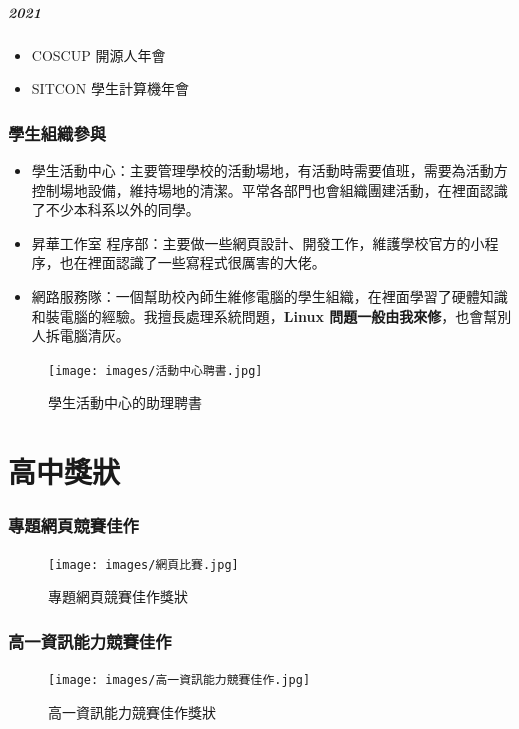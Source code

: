 \documentclass[classical]{einfart}
\providecommand{\tightlist}{%
  \setlength{\itemsep}{0pt}\setlength{\parskip}{0pt}}
\begin{document}
\subsubsection*{2021}

\begin{itemize}
\tightlist
\item
  COSCUP 開源人年會
\item
  SITCON 學生計算機年會
\end{itemize}
\newpage
\section{學生組織參與}

\begin{itemize}
\tightlist
\item
  學生活動中心：主要管理學校的活動場地，有活動時需要值班，需要為活動方控制場地設備，維持場地的清潔。平常各部門也會組織團建活動，在裡面認識了不少本科系以外的同學。
\item
  昇華工作室
  程序部：主要做一些網頁設計、開發工作，維護學校官方的小程序，也在裡面認識了一些寫程式很厲害的大佬。
\item
  網路服務隊：一個幫助校內師生維修電腦的學生組織，在裡面學習了硬體知識和裝電腦的經驗。我擅長處理系統問題，\textbf{Linux 問題一般由我來修}，也會幫別人拆電腦清灰。
\end{itemize}
\begin{figure}[H]
    \centering
    \texttt{[image: images/活動中心聘書.jpg]}
    \caption{學生活動中心的助理聘書}
\end{figure}

\part{高中獎狀}

\section{專題網頁競賽佳作}

\begin{figure}[H]
    \centering
    \texttt{[image: images/網頁比賽.jpg]}
    \caption{專題網頁競賽佳作獎狀}
\end{figure}

\section{高一資訊能力競賽佳作}

\begin{figure}[H]
    \centering
    \texttt{[image: images/高一資訊能力競賽佳作.jpg]}
    \caption{高一資訊能力競賽佳作獎狀}
\end{figure}
\end{document}
